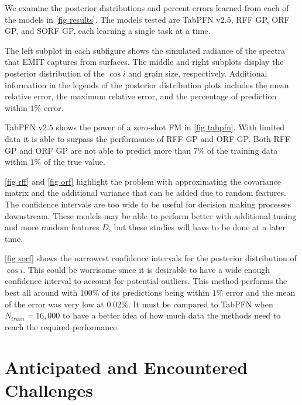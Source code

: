 \documentclass[11pt]{article}
\begin{document}
We examine the posterior distributions and percent errors learned from each of the models in \ref{fig results}. The models tested are TabPFN v$2.5$, RFF GP, ORF GP, and SORF GP, each learning a single task at a time.

The left subplot in each subfigure shows the simulated radiance of the spectra that EMIT captures from surfaces. The middle and right subplots display the posterior distribution of the $\cos{i}$ and grain size, respectively. Additional information in the legends of the posterior distribution plots includes the mean relative error, the maximum relative error, and the percentage of prediction within $1\%$ error.

TabPFN v$2.5$ shows the power of a zero-shot FM in \ref{fig tabpfn}. With limited data it is able to surpass the performance of RFF GP and ORF GP. Both RFF GP and ORF GP are not able to predict more than $7\%$ of the training data within $1\%$ of the true value. 

\ref{fig rff} and \ref{fig orf} highlight the problem with approximating the covariance matrix and the additional variance that can be added due to random features. The confidence intervals are too wide to be useful for decision making processes downstream. These models may be able to perform better with additional tuning and more random features $D$, but these studies will have to be done at a later time.

\ref{fig sorf} shows the narrowest confidence intervals for the posterior distribution of $\cos{i}$. This could be worrisome since it is desirable to have a wide enough confidence interval to account for potential outliers. This method performs the best all around with $100\%$ of its predictions being within $1\%$ error and the mean of the error was very low at $0.02\%$. It must be compared to TabPFN when $N_{train}=16,000$ to have a better idea of how much data the methods need to reach the required performance.

\section{Anticipated and Encountered Challenges}
\label{sec:challenges}

\end{document}
